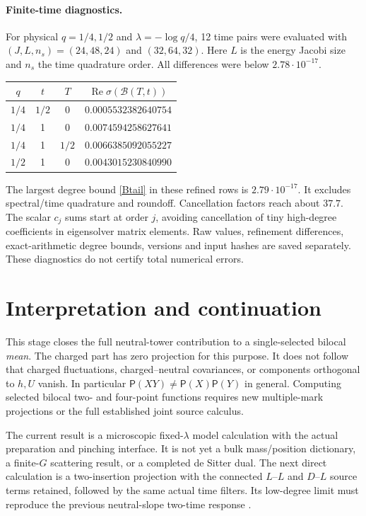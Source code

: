 \documentclass[11pt]{article}
\newcommand{\PP}{\mathsf P}
\begin{document}
\paragraph{Finite-time diagnostics.}
For physical $q=1/4,1/2$ and $\lambda=-\log q/4$, 12 time pairs
were evaluated with $(J,L,n_s)=(24,48,24)$ and $(32,64,32)$.
Here $L$ is the energy Jacobi size and $n_s$ the time quadrature
order. All differences were below $2.78\cdot10^{-17}$.
\begin{center}
\begin{tabular}{cccc}
\toprule
$q$&$t$&$T$&$\operatorname{Re}\sigma(\mathcal B(T,t))$\\\midrule
$1/4$&$1/2$&0&$0.0005532382640754$\\
$1/4$&1&0&$0.0074594258627641$\\
$1/4$&1&$1/2$&$0.0066385092055227$\\
$1/2$&1&0&$0.0043015230840990$\\
\bottomrule
\end{tabular}
\end{center}
The largest degree bound \eqref{Btail} in these refined rows is
$2.79\cdot10^{-17}$. It excludes spectral/time quadrature and
roundoff. Cancellation factors reach about $37.7$.
The scalar $c_j$ sums start at order $j$, avoiding cancellation
of tiny high-degree coefficients in eigensolver matrix elements.
Raw values, refinement differences, exact-arithmetic degree bounds,
versions and input hashes are saved separately. These diagnostics
do not certify total numerical errors.

\newpage
\section{Interpretation and continuation}
This stage closes the full neutral-tower contribution to a
single-selected bilocal \emph{mean}. The charged part has zero
projection for this purpose. It does not follow that charged
fluctuations, charged--neutral covariances, or components
orthogonal to $h,U$ vanish. In particular
$\PP(XY)\ne\PP(X)\PP(Y)$ in general. Computing selected bilocal
two- and four-point functions requires new multiple-mark projections
or the full established joint source calculus.

The current result is a microscopic fixed-$\lambda$ model
calculation with the actual preparation and pinching interface.
It is not yet a bulk mass/position dictionary, a finite-$G$
scattering result, or a completed de Sitter dual. The next direct
calculation is a two-insertion projection with the connected
$L$--$L$ and $D$--$L$ source terms retained, followed by the same
actual time filters. Its low-degree limit must reproduce the
previous neutral-slope two-time response \cite{response}.
\end{document}
